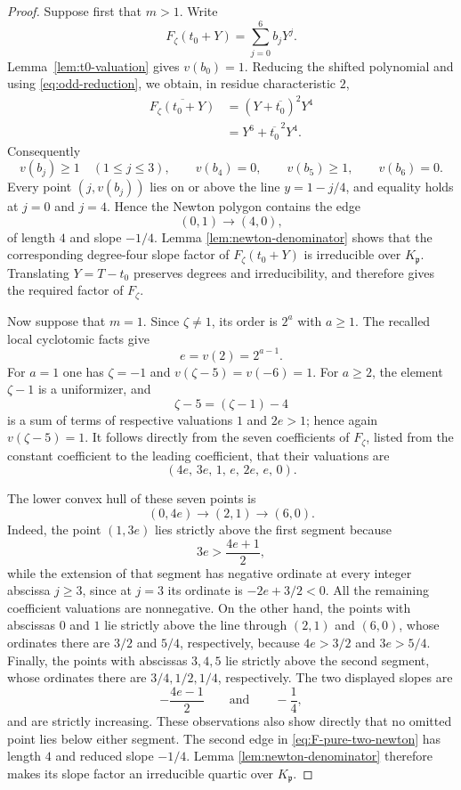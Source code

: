 \begin{proof}
Suppose first that $m>1$.  Write
\[
 F_\zeta(t_0+Y)=\sum_{j=0}^6 b_jY^j.
\]
Lemma~\ref{lem:t0-valuation} gives $v(b_0)=1$.  Reducing the shifted
polynomial and using \eqref{eq:odd-reduction}, we obtain, in residue
characteristic $2$,
\begin{align*}
 \overline{F_\zeta(t_0+Y)}
 &=(Y+\overline{t_0})^2Y^4 \\
 &=Y^6+\overline{t_0}^{\,2}Y^4.
\end{align*}
Consequently
\[
 v(b_j)\geq1\quad(1\leq j\leq3),
 \qquad v(b_4)=0,
 \qquad v(b_5)\geq1,
 \qquad v(b_6)=0.
\]
Every point $(j,v(b_j))$ lies on or above the line
$y=1-j/4$, and equality holds at $j=0$ and $j=4$.  Hence the Newton
polygon contains the edge
\[
 (0,1)\longrightarrow(4,0),
\]
of length $4$ and slope $-1/4$.  Lemma
\ref{lem:newton-denominator} shows that the corresponding degree-four
slope factor of $F_\zeta(t_0+Y)$ is irreducible over
$K_{\mathfrak p}$.  Translating $Y=T-t_0$ preserves degrees and
irreducibility, and therefore gives the required factor of $F_\zeta$.

Now suppose that $m=1$.  Since $\zeta\ne1$, its order is $2^a$ with
$a\geq1$.  The recalled local cyclotomic facts give
\[
 e=v(2)=2^{a-1}.
\]
For $a=1$ one has $\zeta=-1$ and
$v(\zeta-5)=v(-6)=1$.  For $a\geq2$, the element $\zeta-1$ is a
uniformizer, and
\[
 \zeta-5=(\zeta-1)-4
\]
is a sum of terms of respective valuations $1$ and $2e>1$; hence again
$v(\zeta-5)=1$.  It follows directly from the seven coefficients of
$F_\zeta$, listed from the constant coefficient to the leading
coefficient, that their valuations are
\begin{equation}
 (4e,\,3e,\,1,\,e,\,2e,\,e,\,0).
 \label{eq:F-pure-two-valuations}
\end{equation}

The lower convex hull of these seven points is
\begin{equation}
 (0,4e)\longrightarrow(2,1)\longrightarrow(6,0).
 \label{eq:F-pure-two-newton}
\end{equation}
Indeed, the point $(1,3e)$ lies strictly above the first segment because
\[
 3e>\frac{4e+1}{2},
\]
while the extension of that segment has negative ordinate at every
integer abscissa $j\geq3$, since at $j=3$ its ordinate is
$-2e+3/2<0$.  All the remaining coefficient valuations are
nonnegative.  On the other hand, the points with abscissas $0$ and $1$
lie strictly above the line through $(2,1)$ and $(6,0)$, whose
ordinates there are $3/2$ and $5/4$, respectively, because
$4e>3/2$ and $3e>5/4$.  Finally, the points with abscissas $3,4,5$ lie
strictly above the second segment, whose ordinates there are
$3/4,1/2,1/4$, respectively.  The
two displayed slopes are
\[
 -\frac{4e-1}{2}
 \qquad\text{and}\qquad
 -\frac14,
\]
and are strictly increasing.  These observations also show directly
that no omitted point lies below either segment.  The second edge in
\eqref{eq:F-pure-two-newton} has length $4$ and reduced slope $-1/4$.
Lemma \ref{lem:newton-denominator} therefore makes its slope factor an
irreducible quartic over $K_{\mathfrak p}$.
\end{proof}

